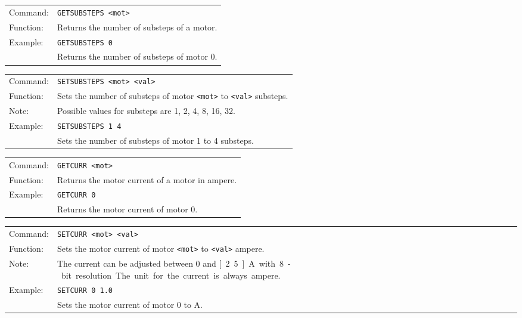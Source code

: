 \vspace{\vdistace}

\begin{table}[!htbp]
  \begin{tabularx}{\textwidth}{lX}
    Command:  & \texttt{GETSUBSTEPS <mot>}\\
    Function: & Returns the number of substeps of a motor.\\
    Example:  & \texttt{GETSUBSTEPS 0}\\
              & Returns the number of substeps of motor 0.
  \end{tabularx}
\end{table}

\vspace{\vdistace}

\begin{table}[!htbp]
  \begin{tabularx}{\textwidth}{lX}
    Command:  & \texttt{SETSUBSTEPS <mot> <val>}\\
    Function: & Sets the number of substeps of motor \texttt{<mot>} to \texttt{<val>} substeps.\\
    Note:     & Possible values for substeps are 1, 2, 4, 8, 16, 32.\\
    Example:  & \texttt{SETSUBSTEPS 1 4}\\
              & Sets the number of substeps of motor 1 to 4 substeps.
  \end{tabularx}
\end{table}

\vspace{\vdistace}

\begin{table}[!htbp]
  \begin{tabularx}{\textwidth}{lX}
    Command:  & \texttt{GETCURR <mot>}\\
    Function: & Returns the motor current of a motor in ampere.\\
    Example:  & \texttt{GETCURR 0}\\
              & Returns the motor current of motor 0.
  \end{tabularx}
\end{table}

\vspace{\vdistace}

\begin{table}[!htbp]
  \begin{tabularx}{\textwidth}{lX}
    Command:  & \texttt{SETCURR <mot> <val>}\\
    Function: & Sets the motor current of motor \texttt{<mot>} to \texttt{<val>} ampere.\\
    Note:     & The current can be adjusted between 0 and \unit[2.5]{A} with 8-bit resolution. The unit for the current is always ampere.\\
    Example:  & \texttt{SETCURR 0 1.0}\\
              & Sets the motor current of motor 0 to \unit[1]{A}.
  \end{tabularx}
\end{table}


